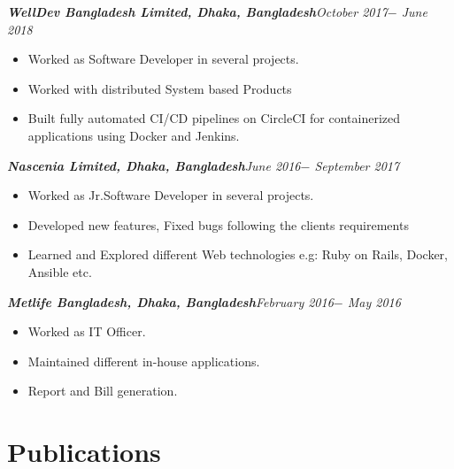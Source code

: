 \documentclass[11pt, a4paper]{awesome-cv}
\begin{document}
{\sl \textbf{WellDev Bangladesh Limited, Dhaka, Bangladesh}\hfill October 2017$-$ June 2018}\\
\vspace{-17pt}
\begin{itemize}
	\item Worked as Software Developer in several projects.
	\vspace*{-.5em}
	\item Worked with distributed System based Products
	\vspace*{-.5em}
	\item Built fully automated CI/CD pipelines on CircleCI for containerized applications using Docker and Jenkins. 
\end{itemize}

{\sl \textbf{Nascenia Limited, Dhaka, Bangladesh}\hfill June 2016$-$ September 2017}\\
\vspace{-17pt}
\begin{itemize}
	\item Worked as Jr.Software Developer in several projects.
	\vspace*{-.5em}
	\item Developed new features, Fixed bugs following the clients requirements 
	\vspace*{-.5em}
	\item Learned and Explored different Web technologies e.g: Ruby on Rails, Docker, Ansible etc. 
\end{itemize}

{\sl \textbf{Metlife Bangladesh, Dhaka, Bangladesh}\hfill February 2016$-$ May 2016}\\
\vspace{-17pt}
\begin{itemize}
	\item Worked as IT Officer.
	\vspace*{-.5em}
	\item Maintained different in-house applications.
	\vspace*{-.5em}
	\item Report and Bill generation. 
\end{itemize}

\vspace{-18pt}
\section*{Publications}
\vspace{-20pt}
\noindent\makebox[\linewidth]{\rule{500pt}{1.8pt}}
\end{document}
